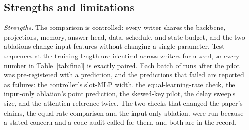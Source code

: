 \documentclass[conference]{IEEEtran}
\begin{document}
\subsection{Strengths and limitations}

\textit{Strengths.} The comparison is controlled: every writer shares the
backbone, projections, memory, answer head, data, schedule, and state budget,
and the two ablations change input features without changing a single
parameter. Test sequences at the training length are identical across
writers for a seed, so every number in Table~\ref{tab:final} is exactly
paired. Each batch of runs after the pilot was pre-registered with a prediction,
and the predictions that failed are reported as failures: the controller's
slot-MLP width, the equal-learning-rate check, the input-only ablation's
point prediction, the skewed-key pilot, the delay sweep's size, and the
attention reference twice. The two checks that
changed the paper's claims, the equal-rate comparison and the input-only
ablation, were run because a stated concern and a code audit called for them,
and both are in the record.
\end{document}
